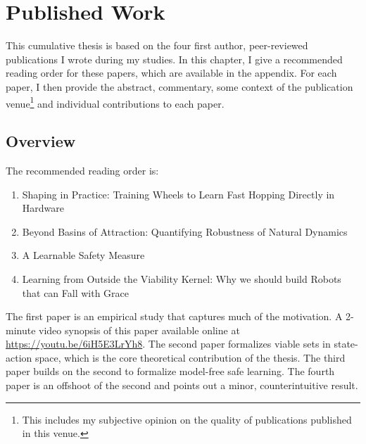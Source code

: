 
\chapter{Published Work} \label{chap:pubs}

This cumulative thesis is based on the four first author, peer-reviewed publications I wrote during my studies. In this chapter, I give a recommended reading order for these papers, which are available in the appendix. For each paper, I then provide the abstract, commentary, some context of the publication venue\footnote{This includes my subjective opinion on the quality of publications published in this venue.} and individual contributions to each paper.

\section{Overview}
The recommended reading order is:
\begin{enumerate}
    \item Shaping in Practice: Training Wheels to Learn Fast Hopping Directly in Hardware
    \item Beyond Basins of Attraction: Quantifying Robustness of Natural Dynamics
    \item A Learnable Safety Measure
    \item Learning from Outside the Viability Kernel: Why we should build Robots that can Fall with Grace
\end{enumerate}
The first paper is an empirical study that captures much of the motivation. A 2-minute video synopsis of this paper available online at \url{https://youtu.be/6iH5E3LrYh8}. The second paper formalizes viable sets in state-action space, which is the core theoretical contribution of the thesis. The third paper builds on the second to formalize model-free safe learning. The fourth paper is an offshoot of the second and points out a minor, counterintuitive result.

